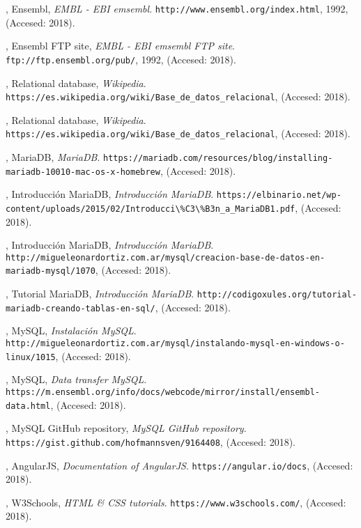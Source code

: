 \documentclass[12pt,a4paper]{article}
\begin{document}
\begin{thebibliography}{9}

    
,
   Ensembl,
    \emph{EMBL - EBI emsembl}.
    \verb|http://www.ensembl.org/index.html|,
    1992,
    (Accesed: 2018).
    
,
   Ensembl FTP site,
    \emph{EMBL - EBI emsembl FTP site}.
    \verb|ftp://ftp.ensembl.org/pub/|,
    1992,
    (Accesed: 2018).
    
,
   Relational database,
    \emph{Wikipedia}.
    \verb|https://es.wikipedia.org/wiki/Base_de_datos_relacional|,
    (Accesed: 2018).
    
,
   Relational database,
    \emph{Wikipedia}.
    \verb|https://es.wikipedia.org/wiki/Base_de_datos_relacional|,
    (Accesed: 2018).
    
,
   MariaDB,
    \emph{MariaDB}.
    \verb|https://mariadb.com/resources/blog/installing-mariadb-10010-mac-os-x-homebrew|,
    (Accesed: 2018).
    
,
   Introducción MariaDB,
    \emph{Introducción MariaDB}.
    \verb|https://elbinario.net/wp-content/uploads/2015/02/Introducci\%C3\%B3n_a_MariaDB1.pdf|,
    (Accesed: 2018).
    
,
   Introducción MariaDB,
    \emph{Introducción MariaDB}.
    \verb|http://migueleonardortiz.com.ar/mysql/creacion-base-de-datos-en-mariadb-mysql/1070|,
    (Accesed: 2018).
    
,
   Tutorial MariaDB,
    \emph{Introducción MariaDB}.
    \verb|http://codigoxules.org/tutorial-mariadb-creando-tablas-en-sql/|,
    (Accesed: 2018).
    
,
   MySQL,
    \emph{Instalación MySQL}.
    \verb|http://migueleonardortiz.com.ar/mysql/instalando-mysql-en-windows-o-linux/1015|,
    (Accesed: 2018).
    
,
   MySQL,
    \emph{Data transfer MySQL}.
    \verb|https://m.ensembl.org/info/docs/webcode/mirror/install/ensembl-data.html|,
    (Accesed: 2018).
    
,
   MySQL GitHub repository,
    \emph{MySQL GitHub repository}.
    \verb|https://gist.github.com/hofmannsven/9164408|,
    (Accesed: 2018).
    
,
   AngularJS,
    \emph{Documentation of AngularJS}.
    \verb|https://angular.io/docs|,
    (Accesed: 2018).
    
,
   W3Schools,
    \emph{HTML \& CSS tutorials}.
    \verb|https://www.w3schools.com/|,
    (Accesed: 2018).
    

\end{thebibliography}
\end{document}
